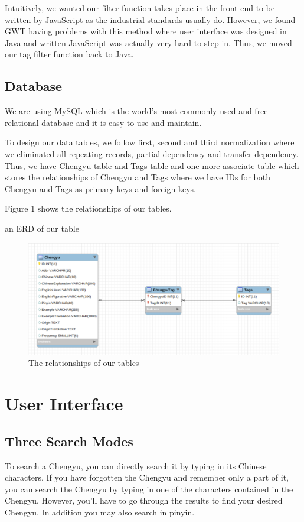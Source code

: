 \documentclass[11pt]{article} %
\begin{document}
Intuitively, we wanted our filter function takes place in the front-end to be written by JavaScript as the industrial standards usually do. However, we found GWT having problems with this method where user interface was designed in Java and written JavaScript was actually very hard to step in. Thus, we moved our tag filter function back to Java. 

\subsection{Database}
\indent We are using MySQL which is the world's most commonly used and free relational database and it is easy to use and maintain.

To design our data tables, we follow first, second and third normalization where we eliminated all repeating records, partial dependency and transfer dependency. Thus, we have Chengyu table and Tags table and one more associate table which stores the relationships of Chengyu and Tags where we have IDs for both Chengyu and Tags as primary keys and foreign keys.

Figure 1 shows the relationships of our tables.

\indent an ERD of our table
\begin{figure}[htbp]
\begin{center}
\includegraphics[width=15cm]{erd.png}
\caption{The relationships of our tables}
\label{default}
\end{center}
\end{figure}

\section{User Interface}

\subsection{Three Search Modes}
\indent To search a Chengyu, you can directly search it by typing in its Chinese characters. If you have forgotten the Chengyu and remember only a part of it, you can search the Chengyu by typing in one of the characters contained in the Chengyu. However, you'll have to go through the results to find your desired Chengyu. In addition you may also search in pinyin.
\end{document}
